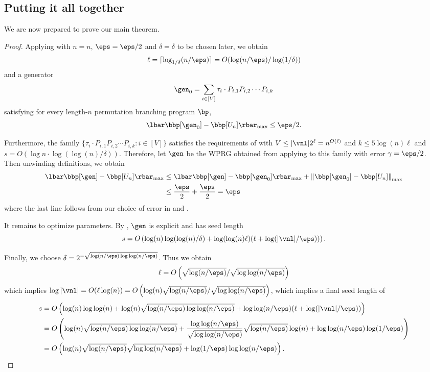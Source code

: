\documentclass{toc}
\begin{document}
\subsection{Putting it all together}
We are now prepared to prove our main theorem.
\cycleMatrix*
\begin{proof}
Applying  with $n=n$, $\eps=\eps/2$ and $\delta=\delta$ to be chosen later, we obtain 
$$\ell=\lceil \log_{1/\delta}(n/\eps)\rceil = O(\log(n/\eps)/\log(1/\delta))$$ 
and a generator
\[\gen_0 = \sum_{i\in [V]}\tau_i\cdot P_{i,1}P_{i,2}\cdots P_{i,k}\]
satisfying for every length-$n$ permutation branching program $\bp$,
$$\lbar\bbp[\gen_0] - \bbp[U_n]\rbar_{\max}\leq \eps/2.$$

Furthermore, the family $\{\tau_i\cdot P_{i,1}P_{i,2}\cdots P_{i,k}:i\in [V]\}$ satisfies the requirements of  with $V\leq |\vnl|2^\ell=n^{O(\ell)}$ and $k\leq 5\log(n)\ell$ and $s=O(\log n\cdot\log(\log(n)/\delta))$. Therefore, let $\gen$ be the WPRG obtained from applying  to this family with error $\gamma=\eps/2$.\\

Then unwinding definitions, we obtain
\begin{align*}
    \lbar\bbp[\gen]-\bbp[U_n]\rbar_{\max} &\leq \lbar\bbp[\gen]- \bbp[\gen_0]\rbar_{\max}+ \left\|\bbp[\gen_0] - \bbp[U_n]\right\|_{\max}\\
    &\leq \frac{\eps}{2}+\frac{\eps}{2} = \eps
\end{align*}
where the last line follows from our choice of error in  and .

It remains to optimize parameters. By , $\gen$ is explicit and has seed length
\[s=O\left(\log(n)\log(\log(n)/\delta) + \log(\log(n)\ell)(\ell+\log(|\vnl|/\eps))\right).\]

Finally, we choose $\delta=2^{-\sqrt{\log(n/\eps)\log\log(n/\eps)}}$. Thus we obtain 
$$\ell=O\left(\sqrt{\log(n/\eps)}/\sqrt{\log\log(n/\eps)}\right)$$
which implies $\log|\vnl|=O(\ell\log(n))=O\left(\log(n)\sqrt{\log(n/\eps)}/\sqrt{\log\log(n/\eps)}\right)$, which implies a final seed length of
\begin{align*}
    s &= O\left(\log(n)\log\log(n) +\log(n)\sqrt{\log(n/\eps)\log\log(n/\eps)} + \log\log(n/\eps)(\ell+\log(|\vnl|/\eps))\right)\\
    &= O\left(\log(n)\sqrt{\log(n/\eps)\log\log(n/\eps)} + \frac{\log\log(n/\eps)}{\sqrt{\log\log(n/\eps)}}\sqrt{\log(n/\eps)}\log(n)+\log\log(n/\eps)\log(1/\eps)\right)\\
    &= O\left(\log(n)\sqrt{\log(n/\eps)}\sqrt{\log\log(n/\eps)}+ \log(1/\eps)\log\log(n/\eps)\right). \qedhere
\end{align*}
\end{proof}
\end{document}

